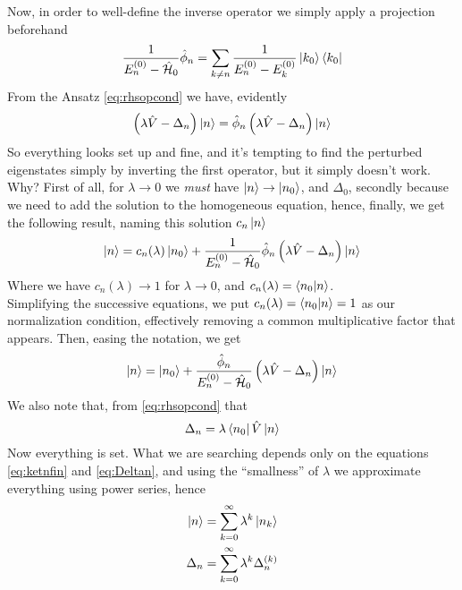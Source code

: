 \documentclass[../qm.tex]{subfiles}
\begin{document}
	Now, in order to well-define the inverse operator we simply apply a projection beforehand
	\begin{equation}
		\frac{1}{E_n^{(0)}-\hat{\mathcal{H}}_0}\hat{\phi}_n=\sum_{k\ne n}\frac{1}{E_n^{(0)}-E_k^{(0)}}\ket{k_0}\bra{k_0}
		\label{eq:invlhsopr}
	\end{equation}
	From the Ansatz \eqref{eq:rhsopcond} we have, evidently
	\begin{equation*}
		\left( \lambda\hat{V}-\Delta_n \right)\ket{n}=\hat{\phi}_n\left( \lambda\hat{V}-\Delta_n \right)\ket{n}
	\end{equation*}
	So everything looks set up and fine, and it's tempting to find the perturbed eigenstates simply by inverting the first operator, but it simply doesn't work. Why? First of all, for $\lambda\to0$ we \emph{must} have $\ket{n}\to\ket{n_0}$, and $\Delta_0$, secondly because we need to add the solution to the homogeneous equation, hence, finally, we get the following result, naming this solution $c_n\ket{n}$
	\begin{equation}
		\ket{n}=c_n(\lambda)\ket{n_0}+\frac{1}{E_n^{(0)}-\hat{\mathcal{H}}_0}\hat{\phi}_n\left( \lambda\hat{V}-\Delta_n \right)\ket{n}
		\label{eq:kncnk0invphivkn}
	\end{equation}
	Where we have $c_n(\lambda)\to1$ for $\lambda\to0$, and $c_n(\lambda)=\bra{n_0}\ket{n}$.\\
	Simplifying the successive equations, we put $c_n(\lambda)=\bra{n_0}\ket{n}=1$ as our normalization condition, effectively removing a common multiplicative factor that appears. Then, easing the notation, we get
	\begin{equation}
		\ket{n}=\ket{n_0}+\frac{\hat{\phi}_n}{E_n^{(0)}-\hat{\mathcal{H}}_0}\left( \lambda\hat{V}-\Delta_n \right)\ket{n}
		\label{eq:ketnfin}
	\end{equation}
	We also note that, from \eqref{eq:rhsopcond} that
	\begin{equation}
		\Delta_n=\lambda\bra{n_0}\hat{V}\ket{n}
		\label{eq:Deltan}
	\end{equation}
	Now everything is set. What we are searching depends only on the equations \eqref{eq:ketnfin} and \eqref{eq:Deltan}, and using the ``smallness'' of $\lambda$ we approximate everything using power series, hence
	\begin{equation}
		\begin{aligned}
			\ket{n}&=\sum_{k=0}^{\infty}\lambda^k\ket{n_k}\\
			\Delta_n&=\sum_{k=0}^{\infty}\lambda^k\Delta_n^{(k)}
		\end{aligned}
		\label{eq:powerseriesapproxdkn}
	\end{equation}
\end{document}
